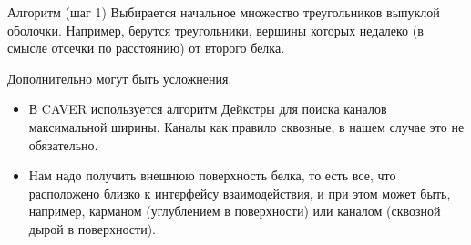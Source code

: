 \documentclass[10pt, xcolor={dvipsnames}]{beamer}
\begin{document}
\begin{frame}{Алгоритм (шаг 1)}
Выбирается начальное множество треугольников выпуклой оболочки. Например, берутся треугольники, вершины которых недалеко (в смысле отсечки по расстоянию) от второго белка.

Дополнительно могут быть усложнения.

\begin{itemize}
\item В CAVER используется алгоритм Дейкстры для поиска каналов максимальной ширины. Каналы как правило сквозные, в нашем случае это не обязательно.
\item Нам надо получить внешнюю поверхность белка, то есть все, что расположено близко к интерфейсу взаимодействия, и при этом может быть, например, карманом (углублением в поверхности) или каналом (сквозной дырой в поверхности).
\end{itemize}
\end{frame}
\end{document}
